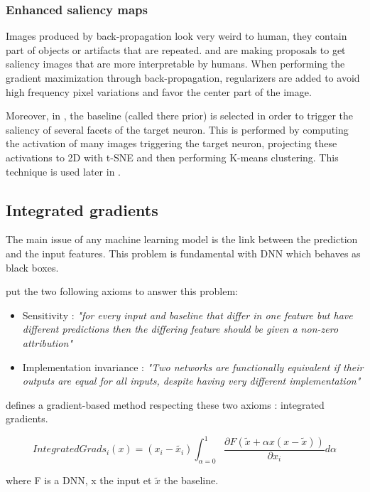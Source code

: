 \subsubsection{Enhanced saliency maps}

Images produced by back-propagation look very weird to human, they contain part of objects or artifacts that are repeated. \cite{Mahendran2015} and \cite{Nguyen2016} are making proposals to get saliency images that are more interpretable by humans. When performing the gradient maximization through back-propagation, regularizers are added to avoid high frequency pixel variations and favor the center part of the image.

Moreover, in \cite{Nguyen2016}, the baseline (called there prior) is selected in order to trigger the saliency of several facets of the target neuron. This is performed by computing the activation of many images triggering the target neuron, projecting these activations to 2D with t-SNE and then performing K-means clustering. This technique is used later in \cite{Carter2019}.

\subsection{Integrated gradients}
\cite{Sundararajan2017}

The main issue of any machine learning model is the link between the prediction and the input features. This problem is fundamental with DNN which behaves as black boxes.

\cite{Sundararajan2017} put the two following axioms to answer this problem: 
\begin{itemize}
    \item Sensitivity : \emph{"for every input and baseline that differ in one feature but have different predictions then the differing feature should be given a non-zero attribution"}
    \item Implementation invariance : \emph{"Two networks are functionally equivalent if their outputs are equal for all inputs, despite having very different implementation"}
\end{itemize}

\cite{Sundararajan2017} defines a gradient-based method respecting these two axioms : integrated gradients.

\[IntegratedGrads_i(x) = (x_i - \tilde{x_i}) \int_{\alpha=0}^{1} \frac{\partial F(\tilde{x}+\alpha x (x-\tilde{x}))}{\partial x_i} d\alpha \]

where F is a DNN, x the input et \(\tilde{x}\) the baseline. 

